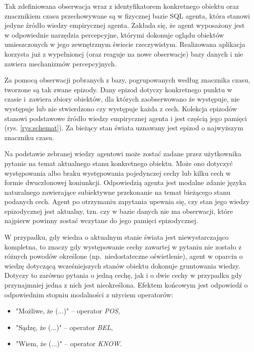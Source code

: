 Tak zdefiniowana obserwacja wraz z identyfikatorem konkretnego obiektu oraz znacznikiem czasu przechowywane są w fizycznej bazie SQL agenta, która stanowi jedyne źródło wiedzy empirycznej agenta. Zakłada się, że agent wyposażony jest w odpowiednie narzędzia percepcyjne, którymi dokonuje oglądu obiektów umieszczonych w jego zewnętrznym świecie rzeczywistym. Realizowana aplikacja korzysta już z wypełnionej (oraz reaguje na nowe obserwacje) bazy danych i nie zawiera mechanizmów percepcyjnych.

Za pomocą obserwacji pobranych z bazy, pogrupowanych według znacznika czasu, tworzone są tak zwane epizody. Dany epizod dotyczy konkretnego punktu w czasie i~zawiera zbiory obiektów, dla których zaobserwowano że występuje, nie występuje lub nie stwierdzono czy występuje każda z cech. Kolekcja epizodów stanowi podstawowe źródło wiedzy empirycznej agenta i jest częścią jego pamięci (rys. \ref{rys:schemat}). Za bieżący stan świata uznawany jest epizod o najwyższym znaczniku czasu.

Na podstawie zebranej wiedzy agentowi może zostać zadane przez użytkownika pytanie na temat aktualnego stanu konkretnego obiektu. Może ono dotyczyć występowania albo braku występowania pojedynczej cechy lub kilku cech w formie dwuczłonowej koniunkcji. Odpowiedzią agenta jest modalne zdanie języka naturalnego zawierające subiektywne przekonanie na temat bieżącego stanu podanych cech. Agent po otrzymaniu zapytania upewnia się, czy stan jego wiedzy epizodycznej jest aktualny, tzn. czy w bazie danych nie ma obserwacji, które najpierw powinny zostać wczytane do jego pamięci epizodycznej.

W przypadku, gdy wiedza o aktualnym stanie świata jest niewystarczająco kompletna, to znaczy gdy występowanie cechy zawartej w pytaniu nie zostało z różnych powodów określone (np.\ niedostateczne oświetlenie), agent w oparciu o wiedzę dotyczącą wcześniejszych stanów obiektu dokonuje gruntowania wiedzy. Dotyczy to zarówno pytania o jedną cechę, jak i o dwie cechy w przypadku gdy przynajmniej jedna z nich jest nieokreślona. Efektem końcowym jest odpowiedź o odpowiednim stopniu modalności z użyciem operatorów: 

\begin{itemize}
	\setlength{\itemindent}{.5in}
	\item "Możliwe, że (...)" -- operator \textit{POS},
	\item "Sądzę, że (...)" -- operator \textit{BEL},
	\item "Wiem, że (...)" -- operator \textit{KNOW}.
\end{itemize}  

